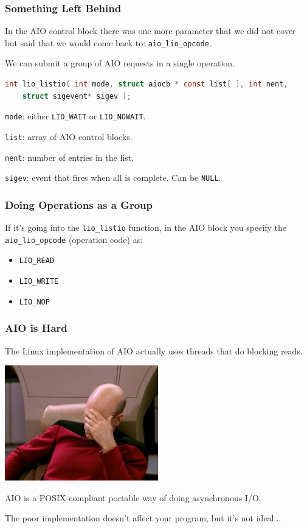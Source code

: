 \begin{frame}[fragile]
\frametitle{Something Left Behind }

In the AIO control block there was one more parameter that we did not cover but said that we would come back to: \texttt{aio\_lio\_opcode}.

We can submit a group of AIO requests in a single operation.

\begin{lstlisting}[language=C]
int lio_listio( int mode, struct aiocb * const list[ ], int nent, 
    struct sigevent* sigev );
\end{lstlisting}

\texttt{mode}: either \texttt{LIO\_WAIT} or \texttt{LIO\_NOWAIT}.

\texttt{list}: array of AIO control blocks.

\texttt{nent}: number of entries in the list.

\texttt{sigev}: event that fires when all is complete. Can be \texttt{NULL}.

\end{frame}


\begin{frame}
\frametitle{Doing Operations as a Group}

 If it's going into the \texttt{lio\_listio} function, in the AIO block you specify the \texttt{aio\_lio\_opcode} (operation code) as:
 
\begin{itemize}
 	\item \texttt{LIO\_READ} 
	\item \texttt{LIO\_WRITE}
	\item \texttt{LIO\_NOP}
\end{itemize}

\end{frame}

\begin{frame}
\frametitle{AIO is Hard}
The Linux implementation of AIO actually uses threads that do blocking reads.

\begin{center}
	\includegraphics[width=0.5\textwidth]{images/facepalm.jpg}
\end{center}

AIO is a POSIX-compliant portable way of doing asynchronous I/O.

The poor implementation doesn't affect your program, but it's not ideal...

\end{frame}





